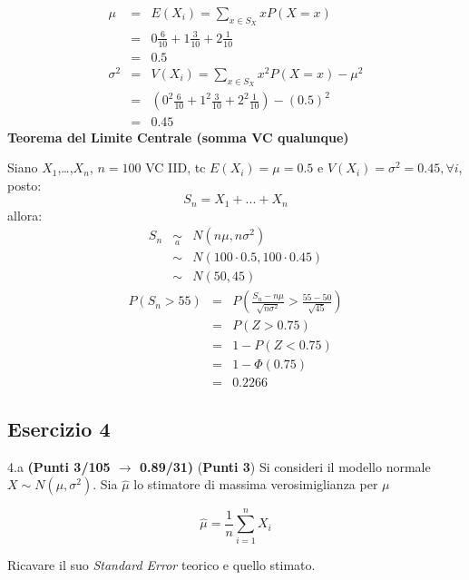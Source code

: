 \documentclass[
  11pt,
]{book}
\theoremstyle{mytheoremstyle}
\theoremstyle{mydefstyle}
\newenvironment{sol}
  {
  \begin{tcolorbox}[enhanced,breakable,arc=0.1mm,boxrule=1pt,colback=white,colframe=iblue,
  title=\bf \fontfamily{lmss}\selectfont \hspace{.5 cm} Soluzione,drop fuzzy shadow]

}{
\end{tcolorbox}
  }
\begin{document}
\begin{sol}
\begin{eqnarray*} \mu &=& E(X_i) = \sum_{x\in S_X}x P(X=x)\\ 
 &=&  0  \frac { 6 }{ 10 }+ 1  \frac { 3 }{ 10 }+ 2  \frac { 1 }{ 10 } \\ 
            &=& 0.5 \\ 
 \sigma^2 &=& V(X_i) = \sum_{x\in S_X}x^2 P(X=x)-\mu^2\\ 
 &=&\left(  0  ^2\frac { 6 }{ 10 }+ 1  ^2\frac { 3 }{ 10 }+ 2  ^2\frac { 1 }{ 10 } \right)-( 0.5 )^2\\ 
            &=& 0.45 
\end{eqnarray*}
\textbf{Teorema del Limite Centrale (somma VC qualunque)}

Siano \(X_1\),\ldots,\(X_n\), \(n=100\) VC IID, tc \(E(X_i)=\mu=0.5\) e \(V(X_i)=\sigma^2=0.45,\forall i\), posto:
\[
      S_n = X_1 + ... + X_n
      \]
allora:\begin{eqnarray*}
  S_n & \mathop{\sim}\limits_{a}& N(n\mu,n\sigma^2) \\
     &\sim & N(100\cdot0.5,100\cdot0.45) \\
     &\sim & N(50,45) 
  \end{eqnarray*}\begin{eqnarray*}
      P( S_n   >   55 ) 
        &=& P\left(  \frac { S_n  -  n\mu }{ \sqrt{n\sigma^2} }  >  \frac { 55  -  50 }{\sqrt{ 45 }} \right)  \\
                 &=& P\left(  Z   >   0.75 \right) \\    &=& 1-P(Z< 0.75 )\\ 
                 &=&  1-\Phi( 0.75 ) \\ &=&  0.2266 
      \end{eqnarray*}

\end{sol}

\subsection{Esercizio 4}\label{esercizio-4-37}

4.a \textbf{(Punti 3/105 \(\rightarrow\) 0.89/31)} (\textbf{Punti 3}) Si consideri il modello normale \(X\sim N(\mu,\sigma^2)\). Sia \(\hat\mu\) lo stimatore di massima verosimiglianza per \(\mu\)

\[
  \hat\mu = \frac 1n \sum_{i=1}^n X_i
\]

Ricavare il suo \emph{Standard Error} teorico e quello stimato.
\end{document}
